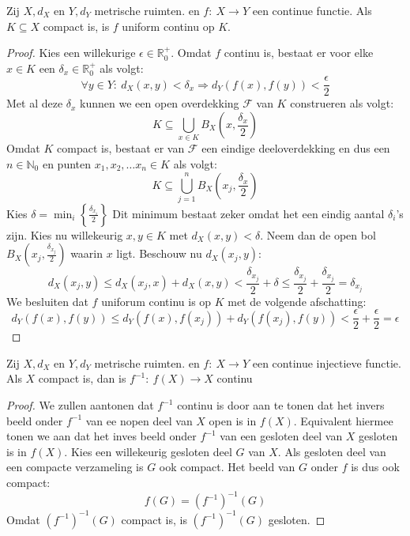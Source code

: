 \documentclass[main.tex]{subfiles}
\begin{document}
\begin{bst}
  Zij $X,d_{X}$ en $Y,d_{Y}$ metrische ruimten. en $f:\ X \rightarrow Y$ een continue functie.
  Als $K \subseteq X$ compact is, is $f$ uniform continu op $K$.

  \begin{proof}
    Kies een willekurige $\epsilon \in \mathbb{R}_{0}^{+}$.
    Omdat $f$ continu is, bestaat er voor elke $x\in K$ een $\delta_{x} \in \mathbb{R}_{0}^{+}$ als volgt: 
    \[ \forall y\in Y:\ d_{X}(x,y) < \delta_{x} \Rightarrow d_{Y}\left(f(x),f(y)\right) < \frac{\epsilon}{2} \]
    Met al deze $\delta_{x}$ kunnen we een open overdekking $\mathcal{F}$ van $K$ construeren als volgt:
    \[ K \subseteq \bigcup_{x\in K}B_{X}\left(x,\frac{\delta_{x}}{2}\right) \]
    Omdat $K$ compact is, bestaat er van $\mathcal{F}$ een eindige deeloverdekking en dus een $n\in \mathbb{N}_{0}$ en punten $x_{1},x_{2},\dotsc x_{n}\in K$ als volgt:
    \[ K \subseteq \bigcup_{j=1}^{n}B_{X}\left(x_{j},\frac{\delta_{x}}{2}\right) \]
    Kies $\delta = \min_{i}\left\{\frac{\delta_{x_{i}}}{2} \right\}$
    Dit minimum bestaat zeker omdat het een eindig aantal $\delta_{i}$'s zijn.
    Kies nu willekeurig $x,y\in K$ met $d_{X}(x,y) < \delta$.
    Neem dan de open bol $B_{X}\left(x_{j},\frac{\delta_{x_{j}}}{2}\right)$ waarin $x$ ligt.
    Beschouw nu $d_{X}(x_{j},y)$:
    \[ d_{X}(x_{j},y) \le d_{X}(x_{j},x) + d_{X}(x,y) < \frac{\delta_{x_{j}}}{2} + \delta \le \frac{\delta_{x_{j}}}{2} + \frac{\delta_{x_{j}}}{2} = \delta_{x_{j}} \]
    We besluiten dat $f$ uniforum continu is op $K$ met de volgende afschatting:
    \[ d_{Y}(f(x),f(y)) \le d_{Y}(f(x),f(x_{j})) + d_{Y}(f(x_{j}),f(y)) < \frac{\epsilon}{2} + \frac{\epsilon}{2} = \epsilon \]
  \end{proof}
\end{bst}

\begin{bst}
  Zij $X,d_{X}$ en $Y,d_{Y}$ metrische ruimten. en $f:\ X \rightarrow Y$ een continue injectieve functie.
  Als $X$ compact is, dan is $f^{-1}:\ f(X) \rightarrow X$ continu

  \begin{proof}
    We zullen aantonen dat $f^{-1}$ continu is door aan te tonen dat het invers beeld onder $f^{-1}$ van ee nopen deel van $X$ open is in $f(X)$.
    Equivalent hiermee tonen we aan dat het inves beeld onder $f^{-1}$ van een gesloten deel van $X$ gesloten is in $f(X)$.
    Kies een willekeurig gesloten deel $G$ van $X$.
    Als gesloten deel van een compacte verzameling is $G$ ook compact.
    Het beeld van $G$ onder $f$ is dus ook compact:
    \[ f(G) = \left(f^{-1}\right)^{-1}(G) \]
    Omdat $\left(f^{-1}\right)^{-1}(G)$ compact is, is $\left(f^{-1}\right)^{-1}(G)$ gesloten.
  \end{proof}
\end{bst}
\end{document}
